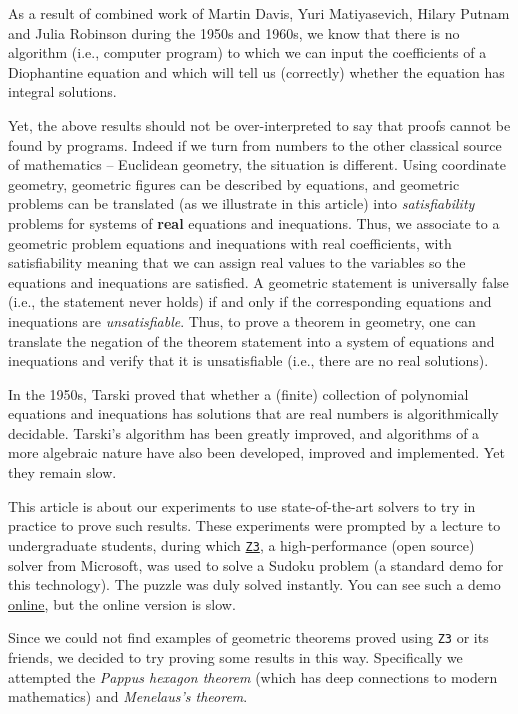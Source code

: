 \documentclass{amsart}
\theoremstyle{plain}
\theoremstyle{definition}
\theoremstyle{remark}
\begin{document}
As a result of combined work of Martin Davis, Yuri Matiyasevich, Hilary
Putnam and Julia Robinson during the 1950s and 1960s, we know that there
is no algorithm (i.e., computer program) to which we can input the
coefficients of a Diophantine equation and which will tell us
(correctly) whether the equation has integral solutions.

Yet, the above results should not be over-interpreted to say that proofs
cannot be found by programs. Indeed if we turn from numbers to the other
classical source of mathematics -- Euclidean geometry, the situation is
different. Using coordinate geometry, geometric figures can be described by equations,
and geometric problems can be translated (as we illustrate in this article) into
\emph{satisfiability} problems for systems of \textbf{real} equations and inequations. Thus, we
associate to a geometric problem equations and inequations with real coefficients,
with satisfiability meaning that we can
assign real values to the variables so the equations and inequations are satisfied.
A geometric statement is universally false (i.e., the statement never holds) if and only if the corresponding equations and inequations are \emph{unsatisfiable}. Thus, to prove a theorem in geometry, one can translate the negation of the theorem statement into a system of equations and inequations and verify that it is unsatisfiable (i.e., there are no real solutions).

In the 1950s, Tarski proved that whether a (finite)
collection of polynomial equations and inequations has solutions that
are real numbers is algorithmically decidable.  Tarski's algorithm has been greatly improved,
and algorithms of a more algebraic nature have also been developed,
improved and implemented. Yet they remain slow.

This article is about our experiments to use
state-of-the-art solvers to try in practice to prove such results.
These experiments were prompted by a lecture
to undergraduate students, during which \href{https://github.com/Z3Prover/z3}{\texttt{Z3}}, a high-performance (open source)
solver from Microsoft, was used to solve a Sudoku problem (a standard demo for this technology). The puzzle was duly solved instantly. You can see such
a demo \href{https://rise4fun.com/Z3/Cs7p}{online}, but the online
version is slow.

Since we could not find examples of geometric theorems proved using \texttt{Z3} or
its friends, we decided to try proving
some results in this way. Specifically we attempted the \emph{Pappus hexagon theorem}
(which has deep connections to modern mathematics) and \emph{Menelaus's theorem}.
\end{document}
